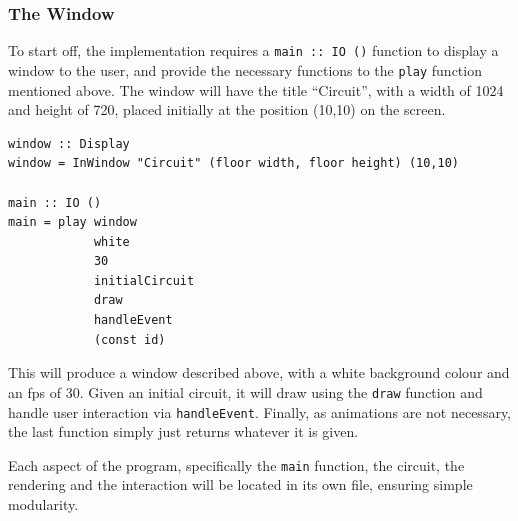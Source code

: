 \documentclass[a4paper,10pt, titlepage, twoside]{article}
\begin{document}
\subsubsection{The Window}
To start off, the implementation requires a \texttt{main :: IO ()} function to display a window to the user, and provide the necessary functions to the \texttt{play} function mentioned above. The window will have the title ``Circuit'', with a width of 1024 and height of 720, placed initially at the position (10,10) on the screen. 
\begin{verbatim}
window :: Display
window = InWindow "Circuit" (floor width, floor height) (10,10)

main :: IO ()
main = play window
            white
            30
            initialCircuit
            draw
            handleEvent
            (const id)
\end{verbatim}
This will produce a window described above, with a white background colour and an fps of 30. Given an initial circuit, it will draw using the \texttt{draw} function and handle user interaction via \texttt{handleEvent}. Finally, as animations are not necessary, the last function simply just returns whatever it is given.\par
Each aspect of the program, specifically the \texttt{main} function, the circuit, the rendering and the interaction will be located in its own file, ensuring simple modularity. 
\end{document}
